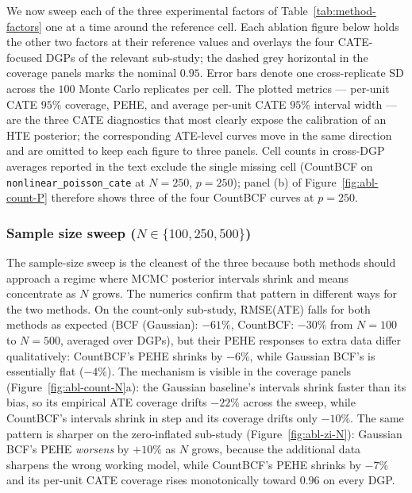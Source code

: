 \documentclass[11pt]{article}
\theoremstyle{plain}
\theoremstyle{definition}
\theoremstyle{remark}
\begin{document}
We now sweep each of the three experimental factors of
Table~\ref{tab:method-factors} one at a time around the reference
cell. Each ablation figure below holds the other two factors at
their reference values and overlays the four CATE-focused DGPs of
the relevant sub-study; the dashed grey horizontal in the coverage
panels marks the nominal $0.95$. Error bars denote one
cross-replicate SD across the $100$ Monte Carlo replicates per cell.
The plotted metrics --- per-unit CATE $95\%$ coverage, PEHE, and
average per-unit CATE $95\%$ interval width --- are the three CATE
diagnostics that most clearly expose the calibration of an HTE
posterior; the corresponding ATE-level curves move in the same
direction and are omitted to keep each figure to three panels. Cell
counts in cross-DGP averages reported in the text exclude the single
missing cell (CountBCF on \verb|nonlinear_poisson_cate| at
$N = 250$, $p = 250$); panel (b) of Figure~\ref{fig:abl-count-P}
therefore shows three of the four CountBCF curves at $p = 250$.

\subsubsection*{Sample size sweep ($N \in \{100, 250, 500\}$)}

The sample-size sweep is the cleanest of the three because both
methods should approach a regime where MCMC posterior intervals
shrink and means concentrate as $N$ grows. The numerics confirm
that pattern in different ways for the two methods. On the
count-only sub-study, RMSE(ATE) falls for both methods as expected
(BCF (Gaussian): $-61\%$, CountBCF: $-30\%$ from $N = 100$ to
$N = 500$, averaged over DGPs), but their PEHE responses to extra
data differ qualitatively: CountBCF's PEHE shrinks by $-6\%$, while
Gaussian BCF's is essentially flat ($-4\%$). The mechanism is
visible in the coverage panels (Figure~\ref{fig:abl-count-N}a): the
Gaussian baseline's intervals shrink faster than its bias, so its
empirical ATE coverage drifts $-22\%$ across the sweep, while
CountBCF's intervals shrink in step and its coverage drifts only
$-10\%$. The same pattern is sharper on the zero-inflated
sub-study (Figure~\ref{fig:abl-zi-N}): Gaussian BCF's PEHE
\emph{worsens} by $+10\%$ as $N$ grows, because the additional data
sharpens the wrong working model, while CountBCF's PEHE shrinks by
$-7\%$ and its per-unit CATE coverage rises monotonically toward
$0.96$ on every DGP.
\end{document}
